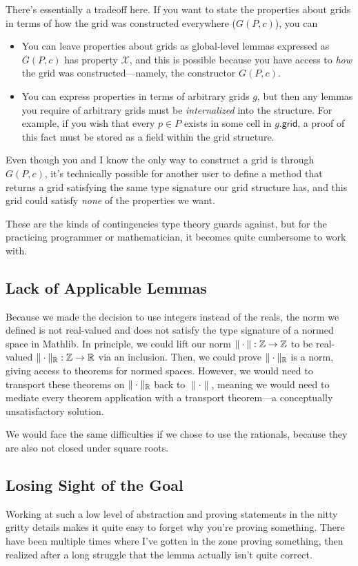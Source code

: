 \documentclass{article}
\begin{document}
There's essentially a tradeoff here.
If you want to state the properties about grids in terms of how the grid was constructed everywhere ($G(P, c)$), you can
\begin{itemize}
  \item You can leave properties about grids as global-level lemmas expressed as $G(P, c)$ has property $\mathcal{X}$, and this is possible because you have access to \textit{how} the grid was constructed---namely, the constructor $G(P, c)$.
  \item You can express properties in terms of arbitrary grids $g$, but then any lemmas you require of arbitrary grids must be \textit{internalized} into the structure.
  For example, if you wish that every $p \in P$ exists in some cell in $g.\mathsf{grid}$, a proof of this fact must be stored as a field within the grid structure.
\end{itemize}
Even though you and I know the only way to construct a grid is through $G(P, c)$, it's technically possible for another user to define a method that returns a grid satisfying the same type signature our grid structure has, and this grid could satisfy \textit{none} of the properties we want.

These are the kinds of contingencies type theory guards against, but for the practicing programmer or mathematician, it becomes quite cumbersome to work with.


\subsection{Lack of Applicable Lemmas}
Because we made the decision to use integers instead of the reals, the norm we defined is not real-valued and does not satisfy the type signature of a normed space in Mathlib.  
In principle, we could lift our norm $\| \cdot \| : \mathbb{Z} \to \mathbb{Z}$ to be real-valued $\| \cdot \|_{\mathbb{R}} : \mathbb{Z} \to \mathbb{R}$ via an inclusion.
Then, we could prove $\| \cdot \|_{\mathbb{R}}$ is a norm, giving access to theorems for normed spaces.
However, we would need to transport these theorems on $\| \cdot \|_{\mathbb{R}}$ back to $\| \cdot \|$, meaning we would need to mediate every theorem application with a transport theorem---a conceptually unsatisfactory solution.

We would face the same difficulties if we chose to use the rationals, because they are also not closed under square roots.

\subsection{Losing Sight of the Goal}
Working at such a low level of abstraction and proving statements in the nitty gritty details makes it quite easy to forget why you're proving something.
There have been multiple times where I've gotten in the zone proving something, then realized after a long struggle that the lemma actually isn't quite correct.
\end{document}
